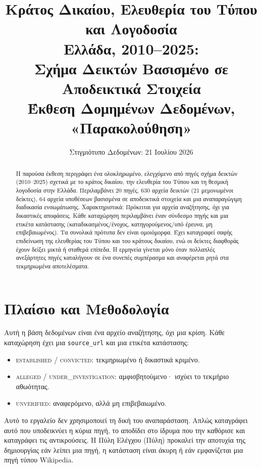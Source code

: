 \documentclass[11pt]{article}
\title{\textbf{Κράτος Δικαίου, Ελευθερία του Τύπου και Λογοδοσία\\
Ελλάδα, 2010--2025:\\ Σχήμα Δεικτών Βασισμένο σε Αποδεικτικά Στοιχεία}\\[4pt]
\large Έκθεση Δομημένων Δεδομένων, «Παρακολούθηση»}
\author{Στιγμιότυπο Δεδομένων: 21 Ιουλίου 2026}
\date{}
\begin{document}
\maketitle

\begin{abstract}
\noindent
Η παρούσα έκθεση περιγράφει ένα ολοκληρωμένο, ελεγχόμενο από πηγές σχήμα δεικτών
(2010--2025) σχετικά με το κράτος δικαίου, την ελευθερία του Τύπου και τη θεσμική
λογοδοσία στην Ελλάδα. Περιλαμβάνει 20 πηγές, 630 αρχεία δεικτών (21 μεμονωμένοι
δείκτες), 64 αρχεία υποθέσεων βασισμένα σε αποδεικτικά στοιχεία και μια
αναπαραγώγιμη διαδικασία ενσωμάτωσης. Χαρακτηριστικά: Πρόκειται για αρχεία
αναζήτησης, όχι για δικαστικές αποφάσεις. Κάθε καταχώρηση περιλαμβάνει έναν
σύνδεσμο πηγής και μια ετικέτα κατάστασης (καταδικασμένος/ένοχος,
κατηγορούμενος/υπό έρευνα, μη επιβεβαιωμένος). Τα συνολικά πρότυπα δεν είναι
ομοιόμορφα. Έχει καταγραφεί σαφής επιδείνωση της ελευθερίας του Τύπου και του
κράτους δικαίου, ενώ οι δείκτες διαφθοράς έχουν δείξει μικτά ή σταθερά επίπεδα. Η
ερμηνεία γίνεται μόνο όταν πολλαπλές ανεξάρτητες πηγές καταλήγουν σε ένα συνεπές
συμπέρασμα και αναφέρεται ρητά στα τεκμηριωμένα αποτελέσματα.
\end{abstract}

\section{Πλαίσιο και Μεθοδολογία}

Αυτή η βάση δεδομένων είναι ένα αρχείο αναζήτησης, όχι μια κρίση. Κάθε καταχώρηση
έχει μια \texttt{source\_url} και μια ετικέτα κατάστασης:

\begin{itemize}[leftmargin=1.4em,itemsep=1pt]
\item \textsc{established} / \textsc{convicted}: τεκμηριωμένο ή δικαστικά κριμένο.
\item \textsc{alleged} / \textsc{under\_investigation}: αμφισβητούμενο· ισχύει το τεκμήριο αθωότητας.
\item \textsc{unverified}: αναφερόμενο, αλλά μη επιβεβαιωμένο.
\end{itemize}

Αυτό το εργαλείο δεν χρησιμοποιεί τη δική του αναπαράσταση. Απλώς καταγράφει αυτό
που υποδεικνύει η κύρια πηγή, το αποδίδει στο ίδρυμα που την καθόρισε και καταγράφει
τις αντικρούσεις. Η Πύλη Ελέγχου (Πύλη) προκαλεί την αποτυχία της δημιουργίας εάν
λείπει μια πηγή, η κατάσταση είναι άκυρη ή εάν εμφανίζεται μια πηγή τύπου Wikipedia.
\end{document}
